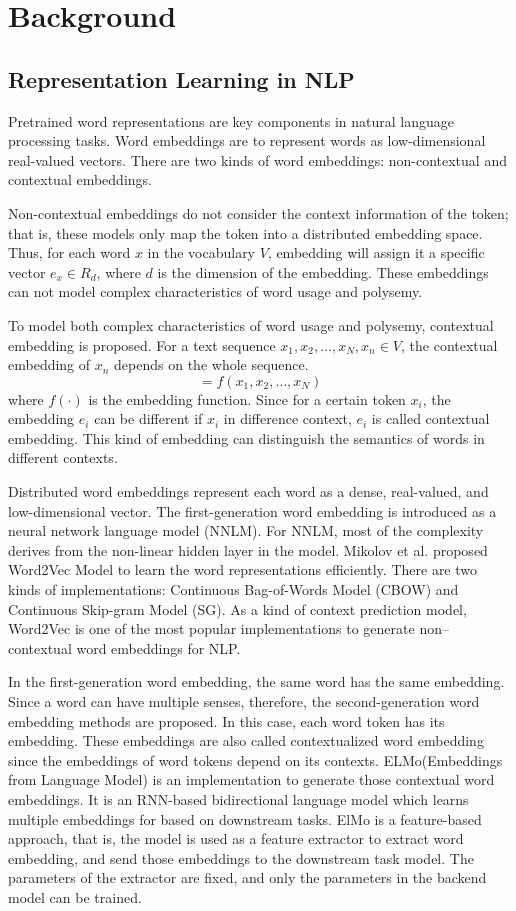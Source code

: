 \documentclass[conference]{IEEEtran}
\begin{document}
\section{Background}
\subsection{Representation Learning in NLP}
Pretrained word representations are key components in natural language
processing tasks. 
Word embeddings are to represent words as low-dimensional real-valued 
vectors.
There are two kinds of word embeddings: non-contextual and contextual embeddings.

Non-contextual embeddings do not consider the context information of the token;
that is, these models only map the token into a distributed embedding space.
Thus, for each word $x$ in the vocabulary $V$, embedding will assign it a 
specific vector $e_x \in R_d$, where $d$ is the dimension of the embedding.
These embeddings can not model complex characteristics of word usage and polysemy.

To model both complex characteristics of word usage and polysemy,
contextual embedding is proposed.
For a text sequence $x_1, x_2, \ldots, x_N, x_n \in V$, 
the contextual embedding of $x_n$ depends on the whole sequence.
\begin{equation}
    [e_1, e_2, \ldots, e_N] = f(x_1, x_2, \ldots, x_N) 
\end{equation}
where $f(\cdot)$ is the embedding function.
Since for a certain token $x_i$, the embedding $e_i$
can be different if $x_i$ in difference context, 
$e_i$ is called contextual embedding. 
This kind of embedding can distinguish the semantics of words
in different contexts.

Distributed word embeddings represent each word as a 
dense, real-valued, and low-dimensional vector.
The first-generation word embedding is introduced as a neural network language model (NNLM).
For NNLM, most of the complexity derives from the non-linear hidden layer in the model.
Mikolov et al. proposed Word2Vec Model to learn the word representations efficiently.
There are two kinds of implementations: Continuous Bag-of-Words Model (CBOW)
and Continuous Skip-gram Model (SG). 
As a kind of context prediction model, Word2Vec is one of the most 
popular implementations to generate non--contextual word embeddings for NLP.

In the first-generation word embedding, the same word has the same embedding.
Since a word can have multiple senses, therefore, the second-generation word 
embedding methods are proposed.
In this case, each word token has its embedding.
These embeddings are also called contextualized word embedding since the embeddings 
of word tokens depend on its contexts.
ELMo(Embeddings from Language Model) is an implementation to generate those 
contextual word embeddings. 
It is an RNN-based bidirectional language model which learns multiple embeddings for 
based on downstream tasks. 
ElMo is a feature-based approach, that is, the model is used as a feature extractor
to extract word embedding, and send those embeddings to the downstream task model.
The parameters of the extractor are fixed, and only the parameters in the backend model can be trained.
\end{document}
